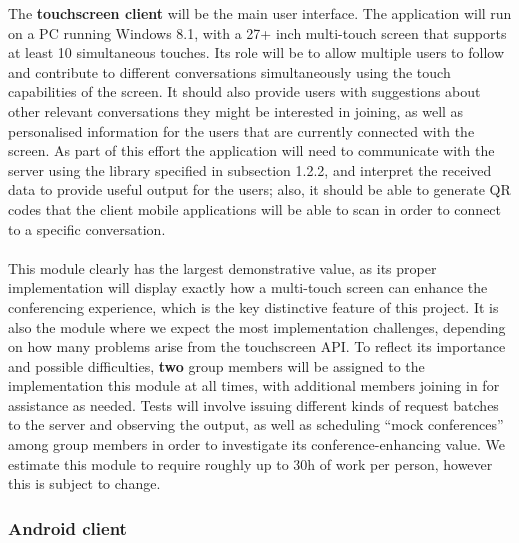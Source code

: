 \documentclass[12p, a4paper, onecolumn]{report}
\begin{document}
The \textbf{touchscreen client} will be the main user interface. The application will run on a PC running Windows 8.1, with a 27+ inch multi-touch screen that supports at least 10 simultaneous touches. Its role will be to allow multiple users to follow and contribute to different conversations simultaneously using the touch capabilities of the screen. It should also provide users with suggestions about other relevant conversations they might be interested in joining, as well as personalised information for the users that are currently connected with the screen. As part of this effort the application will need to communicate with the server using the library specified in subsection 1.2.2, and interpret the received data to provide useful output for the users; also, it should be able to generate QR codes that the client mobile applications will be able to scan in order to connect to a specific conversation. \\ \\
This module clearly has the largest demonstrative value, as its proper implementation will display exactly how a multi-touch screen can enhance the conferencing experience, which is the key distinctive feature of this project. It is also the module where we expect the most implementation challenges, depending on how many problems arise from the touchscreen API. To reflect its importance and possible difficulties, \textbf{two} group members will be assigned to the implementation this module at all times, with additional members joining in for assistance as needed. Tests will involve issuing different kinds of request batches to the server and observing the output, as well as scheduling “mock conferences” among group members in order to investigate its conference-enhancing value. We estimate this module to require roughly up to 30h of work per person, however this is subject to change.

\subsubsection{Android client}
\end{document}
